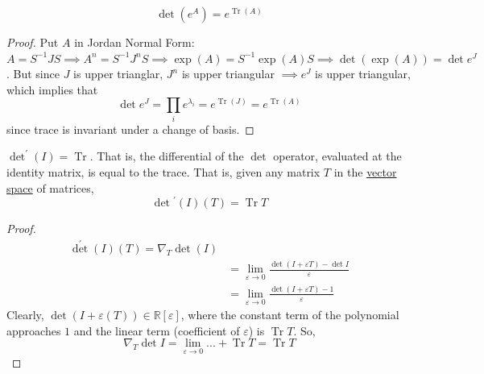 \documentclass{article}
\DeclareMathOperator{\Tr}{Tr}
\newcounter{theorem}[section]
\begin{document}
    \begin{theorem}
      \label{thm:determinant-of-a-matrix-exponential}
      \begin{equation}
        \det{(e^A)} = e^{\Tr{(A)}}
      \end{equation}
    \end{theorem}
    \begin{proof}
      Put $A$ in Jordan Normal Form: $A = S^{-1} J S \implies A^n = S^{-1} J^n S \implies \exp(A) = S^{-1} \exp(A) S \implies \det{(\exp(A))} = \det{e^J}$. But since $J$ is upper trianglar, $J^n$ is upper triangular $\implies e^J$ is upper triangular, which implies that 
      \begin{equation}
        \det{e^J} = \prod_i e^{\lambda_i} = e^{\Tr{(J)}} = e^{\Tr{(A)}}
      \end{equation}
      since trace is invariant under a change of basis. 
    \end{proof}

    \begin{lemma}
      \label{thm:differential-of-the-determinant-at-the-identity}
      $\det^\prime (I) = \Tr$. That is, the differential of the $\det$ operator, evaluated at the identity matrix, is equal to the trace. That is, given any matrix $T$ in the \hyperref[lin-def:vector-space]{vector space} of matrices, 
      \begin{equation}
        \det{}^\prime (I) (T) = \Tr{T}
      \end{equation}
    \end{lemma}
    \begin{proof}
      \begin{align*}
        \det^\prime (I) (T) = \nabla_T \det(I) \\
        & = \lim_{\varepsilon \rightarrow 0} \frac{\det{(I + \varepsilon T)} - \det{I}}{\varepsilon} \\
        & = \lim_{\varepsilon \rightarrow 0} \frac{\det{(I + \varepsilon T)} - 1}{\varepsilon}
      \end{align*}
      Clearly, $\det(I + \varepsilon(T)) \in \mathbb{R}[\varepsilon]$, where the constant term of the polynomial approaches $1$ and the linear term (coefficient of $\varepsilon$) is $\Tr{T}$. So, 
      \begin{equation}
        \nabla_T \det{I} = \lim_{\varepsilon \rightarrow 0} ... + \Tr{T} = \Tr{T}
      \end{equation}
    \end{proof}
\end{document}
